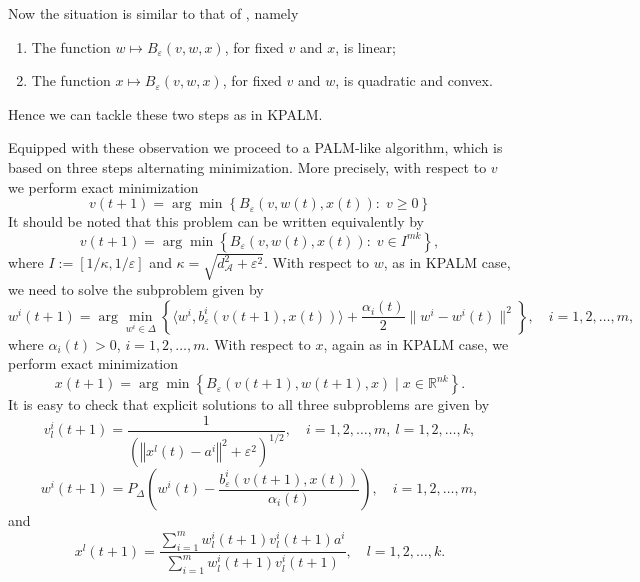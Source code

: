 \documentclass[12pt]{article}
\numberwithin{equation}{section}
\newcommand{\norm}[1]{\left\Vert {#1} \right\Vert} %
\begin{document}
Now the situation is similar to that of , namely
\begin{enumerate}[(1)]
	\item The function $w \mapsto B_{\varepsilon}(v,w,x)$, for fixed $v$ and $x$, is linear;
	\item The function $x \mapsto B_{\varepsilon}(v,w,x)$, for fixed $v$ and $w$, is quadratic and convex.
\end{enumerate}
Hence we can tackle these two steps as in KPALM.

Equipped with these observation we proceed to a PALM-like algorithm, which is based on three steps alternating minimization. More precisely, with respect to $v$ we perform exact minimization
\begin{equation*}
	v(t+1) = \arg\!\min \left\lbrace B_{\varepsilon}(v,w(t),x(t)) : \; v \geq 0\right\rbrace 
\end{equation*}
It should be noted that this problem can be written equivalently by
\begin{equation*}
	v(t+1) = \arg\!\min \left\lbrace B_{\varepsilon}(v,w(t),x(t)) : \; v \in I^{mk} \right\rbrace, \label{v_step}
\end{equation*}
where $I:=\left[1/\kappa, 1/\varepsilon\right]$ and $\kappa = \sqrt{ d_{\mathcal{A}}^2 + {\varepsilon}^2}$. With respect to $w$, as in KPALM case, we need to solve the subproblem given by
\begin{equation}
	w^i(t+1) = \arg\!\min\limits_{w^i \in \Delta} \left\lbrace \langle w^i , b^i_{\varepsilon}(v(t+1),x(t)) \rangle + \frac{\alpha_i(t)}{2} \|w^i - w^i(t)\|^2 \right\rbrace, \quad i=1,2, \ldots, m , \label{w_step}
\end{equation}
where $\alpha_i(t) > 0$, $i=1,2, \ldots, m$. With respect to $x$, again as in KPALM case, we perform exact minimization
\begin{equation}
	x(t+1) = \arg\!\min \left\lbrace B_{\varepsilon}(v(t+1), w(t+1), x) \mid x \in \mathbb{R}^{nk} \right\rbrace . \label{x_step}
\end{equation}
It is easy to check that explicit solutions to all three subproblems are given by
\begin{equation}
	v^i_l(t+1) = \frac{1}{\left(\norm{x^l(t)-a^i}^2 + {\varepsilon}^2 \right)^{1/2}}, \quad i=1,2,\ldots,m, \: l=1,2,\ldots,k , \label{v_step_sol}
\end{equation}
\begin{equation}
	w^i(t+1) = P_{\Delta}\left( w^i(t) - \frac{b^i_{\varepsilon}(v(t+1),x(t))}{\alpha_i(t)} \right), \quad i=1,2,\ldots,m , \label{w_step_sol}
\end{equation}
and
\begin{equation}
	x^l(t+1) = \frac{\sum_{i=1}^{m} w^i_l(t+1)v^i_l(t+1)a^i}{\sum_{i=1}^{m} w^i_l(t+1)v^i_l(t+1)}, \quad l=1,2,\ldots,k . \label{x_step_sol}
\end{equation}
\end{document}
